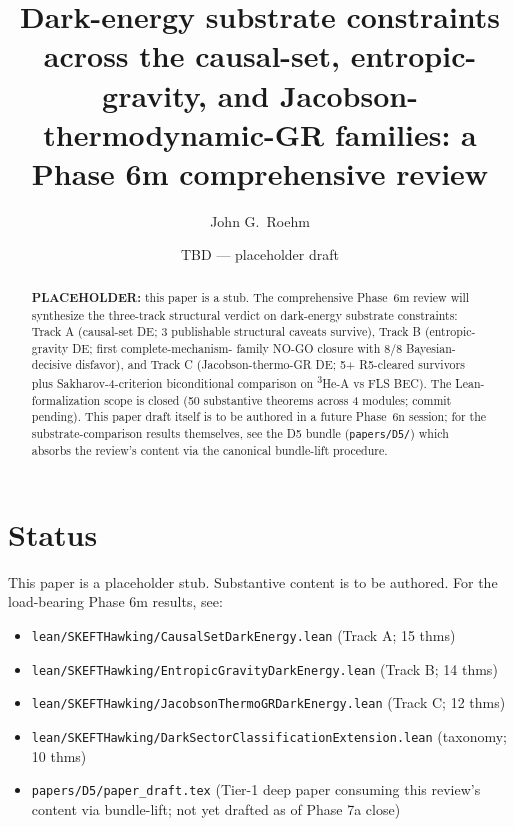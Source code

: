 \documentclass[aps,prd,reprint,nofootinbib,superscriptaddress]{revtex4-2}
\begin{document}
\title{Dark-energy substrate constraints across the causal-set,
entropic-gravity, and Jacobson-thermodynamic-GR families:
a Phase 6m comprehensive review}

\author{John G.\ Roehm}

\date{TBD --- placeholder draft}

\begin{abstract}
\textbf{PLACEHOLDER:} this paper is a stub. The comprehensive Phase~6m
review will synthesize the three-track structural verdict on dark-energy
substrate constraints: Track A (causal-set DE; 3 publishable structural
caveats survive), Track B (entropic-gravity DE; first complete-mechanism-
family NO-GO closure with 8/8 Bayesian-decisive disfavor), and Track C
(Jacobson-thermo-GR DE; 5+ R5-cleared survivors plus Sakharov-4-criterion
biconditional comparison on \textsuperscript{3}He-A vs FLS BEC).
The Lean-formalization scope is closed (50 substantive theorems across
4 modules; commit pending). This paper draft itself is to be authored
in a future Phase~6n session; for the substrate-comparison results
themselves, see the D5 bundle (\texttt{papers/D5/}) which absorbs the
review's content via the canonical bundle-lift procedure.
\end{abstract}

\maketitle

\section{Status}

This paper is a placeholder stub. Substantive content is to be authored.
For the load-bearing Phase 6m results, see:

\begin{itemize}
\item \texttt{lean/SKEFTHawking/CausalSetDarkEnergy.lean} (Track A; 15 thms)
\item \texttt{lean/SKEFTHawking/EntropicGravityDarkEnergy.lean} (Track B; 14 thms)
\item \texttt{lean/SKEFTHawking/JacobsonThermoGRDarkEnergy.lean} (Track C; 12 thms)
\item \texttt{lean/SKEFTHawking/DarkSectorClassificationExtension.lean} (taxonomy; 10 thms)
\item \texttt{papers/D5/paper\_draft.tex} (Tier-1 deep paper consuming this
review's content via bundle-lift; not yet drafted as of Phase 7a close)
\end{itemize}
\end{document}
